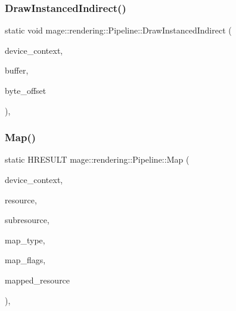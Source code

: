 \mbox{\label{structmage_1_1rendering_1_1_pipeline_acfdf1d2aba1e8c0db9c4ef9e9730f31c}} 
\subsubsection{\texorpdfstring{Draw\+Instanced\+Indirect()}{DrawInstancedIndirect()}}
{\footnotesize\ttfamily static void mage\+::rendering\+::\+Pipeline\+::\+Draw\+Instanced\+Indirect (\begin{DoxyParamCaption}\item[{I\+D3\+D11\+Device\+Context \&}]{device\+\_\+context,  }\item[{I\+D3\+D11\+Buffer \&}]{buffer,  }\item[{\mbox{\hyperlink{namespacemage_aa5d6eaabaac3cdd01873d6a3d27e90f3}{U32}}}]{byte\+\_\+offset }\end{DoxyParamCaption})\hspace{0.3cm}{\ttfamily [static]}, {\ttfamily [noexcept]}}

\mbox{\label{structmage_1_1rendering_1_1_pipeline_ab0176557cd5473bf5cd77836ca2d924f}} 
\subsubsection{\texorpdfstring{Map()}{Map()}}
{\footnotesize\ttfamily static H\+R\+E\+S\+U\+LT mage\+::rendering\+::\+Pipeline\+::\+Map (\begin{DoxyParamCaption}\item[{I\+D3\+D11\+Device\+Context \&}]{device\+\_\+context,  }\item[{I\+D3\+D11\+Resource \&}]{resource,  }\item[{\mbox{\hyperlink{namespacemage_aa5d6eaabaac3cdd01873d6a3d27e90f3}{U32}}}]{subresource,  }\item[{D3\+D11\+\_\+\+M\+AP}]{map\+\_\+type,  }\item[{\mbox{\hyperlink{namespacemage_aa5d6eaabaac3cdd01873d6a3d27e90f3}{U32}}}]{map\+\_\+flags,  }\item[{D3\+D11\+\_\+\+M\+A\+P\+P\+E\+D\+\_\+\+S\+U\+B\+R\+E\+S\+O\+U\+R\+CE \&}]{mapped\+\_\+resource }\end{DoxyParamCaption})\hspace{0.3cm}{\ttfamily [static]}, {\ttfamily [noexcept]}}

